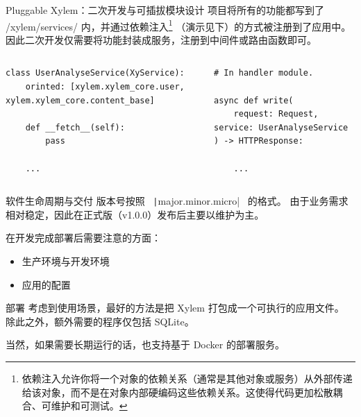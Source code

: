 \documentclass[UTF8]{ctexbeamer}
\begin{document}
\begin{frame}[fragile]{Pluggable Xylem：二次开发与可插拔模块设计}
项目将所有的功能都写到了 /xylem/services/ 内，并通过依赖注入\footnote[1]{依赖注入允许你将一个对象的依赖关系（通常是其他对象或服务）从外部传递给该对象，而不是在对象内部硬编码这些依赖关系。这使得代码更加松散耦合、可维护和可测试。}
（演示见下）的方式被注册到了应用中。
因此二次开发仅需要将功能封装成服务，注册到中间件或路由函数即可。
\begin{columns}
\begin{column}{0.55\textwidth}
\begin{verbatim}
class UserAnalyseService(XyService):
    orinted: [xylem.xylem_core.user, xylem.xylem_core.content_base]

    def __fetch__(self):
        pass
    
    ...

\end{verbatim}
\end{column}
\begin{column}{0.45\textwidth}
\begin{verbatim}
# In handler module.

async def write(
    request: Request, service: UserAnalyseService
) -> HTTPResponse:

    ...
\end{verbatim}
\end{column}
\end{columns}
\end{frame}

\begin{frame}{软件生命周期与交付}
版本号按照 ~\texttt|{major}.{minor}.{micro}|~ 的格式。
由于业务需求相对稳定，因此在正式版（v1.0.0）发布后主要以维护为主。

在开发完成部署后需要注意的方面：
\begin{itemize}
  \item 生产环境与开发环境
  \item 应用的配置
\end{itemize}

\begin{block}{部署}
考虑到使用场景，最好的方法是把 Xylem 打包成一个可执行的应用文件。
除此之外，额外需要的程序仅包括 SQLite。

当然，如果需要长期运行的话，也支持基于 Docker 的部署服务。
\end{block}
\end{frame}
\end{document}
